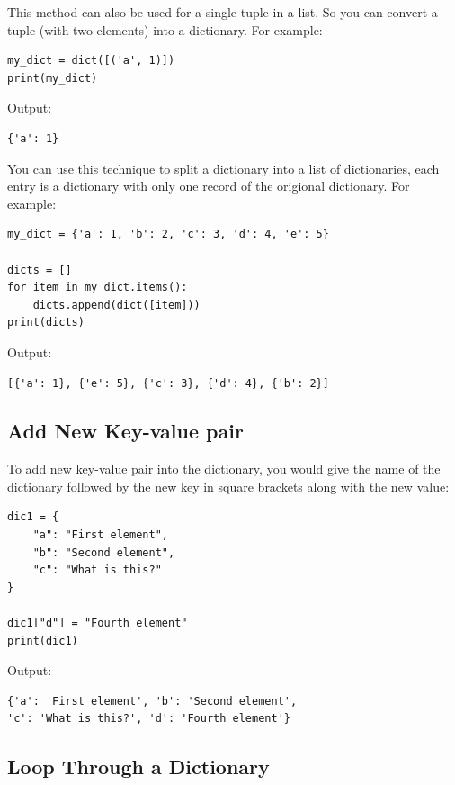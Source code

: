 \documentclass[12pt]{book}
\begin{document}
This method can also be used for a single tuple in a list. So you can convert a tuple (with two elements) into a dictionary. For example:
\begin{verbatim}
my_dict = dict([('a', 1)])
print(my_dict)
\end{verbatim}
Output:
\begin{verbatim}
{'a': 1}
\end{verbatim}
You can use this technique to split a dictionary into a list of dictionaries, each entry is a dictionary with only one record of the origional dictionary. For example:
\begin{verbatim}
my_dict = {'a': 1, 'b': 2, 'c': 3, 'd': 4, 'e': 5}

dicts = []
for item in my_dict.items():
    dicts.append(dict([item]))
print(dicts)
\end{verbatim}
Output:
\begin{verbatim}
[{'a': 1}, {'e': 5}, {'c': 3}, {'d': 4}, {'b': 2}]
\end{verbatim}

\subsection{Add New Key-value pair}
\label{sec:org2bc062e}
To add new key-value pair into the dictionary, you would give the name of the dictionary followed by the new key in square brackets along with the new value:
\begin{verbatim}
dic1 = {
    "a": "First element",
    "b": "Second element",
    "c": "What is this?"
}

dic1["d"] = "Fourth element"
print(dic1)

\end{verbatim}
Output:
\begin{verbatim}
{'a': 'First element', 'b': 'Second element',
'c': 'What is this?', 'd': 'Fourth element'}
\end{verbatim}
\subsection{Loop Through a Dictionary}
\label{sec:org0b61c90}
\end{document}
